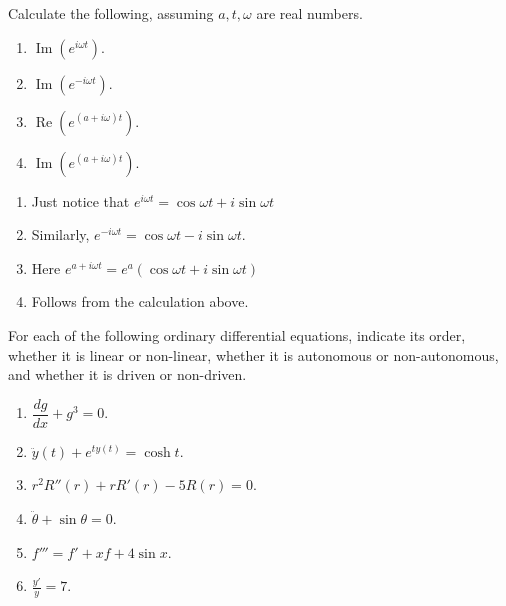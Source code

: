 \documentclass[12 pt, letterpaper]{hmcpset}
\begin{document}
\pagebreak

\begin{problem}[6:]
	Calculate the following, assuming $a, t, \omega$ are real numbers.
	\begin{enumerate}
		\item $\operatorname{Im}(e^{i \omega t})$.
		\item $\operatorname{Im}(e^{-i \omega t})$.
		\item $\operatorname{Re}(e^{(a + i \omega)t})$.
		\item $\operatorname{Im}(e^{(a + i \omega)t})$.
	\end{enumerate}
\end{problem}

\begin{solution}
	\begin{enumerate}
		\item {}

			Just notice that $e^{i \omega t} = \cos{\omega t} + i \sin{\omega t}$
		\item {}

			Similarly, $e^{ - i \omega t} = \cos{\omega t} - i \sin{\omega t}$.
		\item {}

			Here $e^{a + i \omega t} = e^{a}(\cos{\omega t} + i \sin{\omega t})$
		\item {}

			Follows from the calculation above.
	\end{enumerate}
\end{solution}

\pagebreak

\begin{problem}[7:]
	For each of the following ordinary differential equations, indicate its order, whether it is linear or non-linear, whether it is autonomous or non-autonomous, and whether it is driven or non-driven.
	\begin{enumerate}
		\item $\dfrac{dg}{dx} + g^{3} = 0$.
		\item $\ddot{y}(t) + e^{t y(t)} = \cosh{t}$.
		\item $r^{2} R''(r) + r R'(r) - 5R(r) = 0$.
		\item $\ddot{\theta} + \sin{\theta} = 0$.
		\item $f''' = f' + xf + 4 \sin{x}$.
		\item $\frac{y'}{y} = 7$.
	\end{enumerate}
\end{problem}
\end{document}

